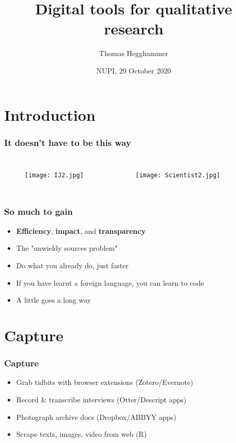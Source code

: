 \documentclass{beamer}
\title{Digital tools for qualitative research}
\author[Hegghammer]{Thomas Hegghammer}
\institute{thomas.hegghammer@ffi.no}
\date{NUPI, 29 October 2020}
\begin{document}
\frame{\titlepage}

\section{Introduction}

\begin{frame}
\frametitle{It doesn't have to be this way}
    \begin{columns}
            \begin{figure}
                \centering
                \texttt{[image: IJ2.jpg]}
            \end{figure}
            \begin{figure}
                \centering
                \texttt{[image: Scientist2.jpg]}
            \end{figure}
    \end{columns}
\end{frame}

\begin{frame}
\frametitle{So much to gain}
    \begin{itemize}
        \item \textbf{Efficiency}, \textbf{impact}, and \textbf{transparency}
        \item The "unwieldy sources problem"
        \item Do what you already do, just faster
        \item If you have learnt a foreign language, you can learn to code
        \item A little goes a long way
    \end{itemize}
\end{frame}

\section{Capture}

\begin{frame}
\frametitle{Capture}
    \begin{itemize}
        \item Grab tidbits with browser extensions (Zotero/Evernote)
        \item Record \& transcribe interviews (Otter/Descript apps)
        \item Photograph archive docs (Dropbox/ABBYY apps)
        \item Scrape texts, images, video from web (R)
    \end{itemize}
\end{frame}
\end{document}
